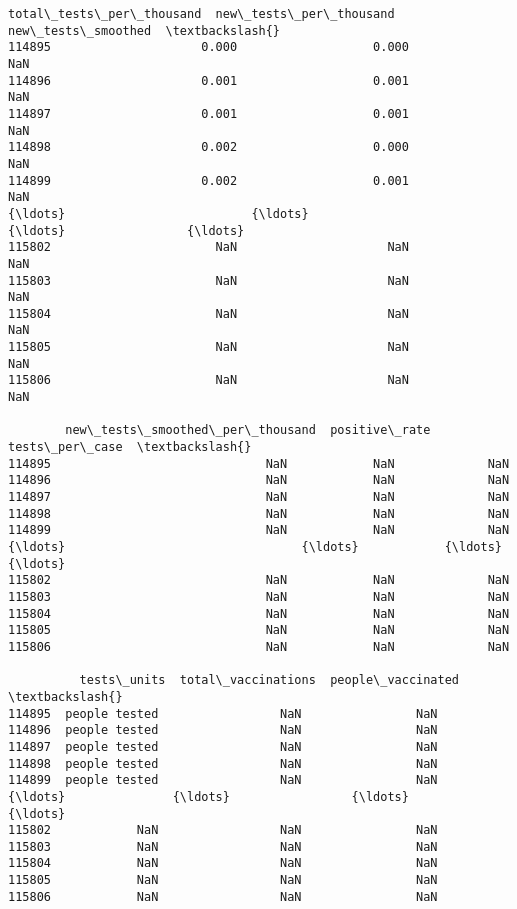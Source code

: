 \documentclass[11pt]{article}
\begin{document}
\begin{tcolorbox}[breakable, size=fbox, boxrule=.5pt, pad at break*=1mm, opacityfill=0]
\begin{Verbatim}[commandchars=\\\{\}]
        total\_tests\_per\_thousand  new\_tests\_per\_thousand  new\_tests\_smoothed  \textbackslash{}
114895                     0.000                   0.000                 NaN
114896                     0.001                   0.001                 NaN
114897                     0.001                   0.001                 NaN
114898                     0.002                   0.000                 NaN
114899                     0.002                   0.001                 NaN
{\ldots}                          {\ldots}                     {\ldots}                 {\ldots}
115802                       NaN                     NaN                 NaN
115803                       NaN                     NaN                 NaN
115804                       NaN                     NaN                 NaN
115805                       NaN                     NaN                 NaN
115806                       NaN                     NaN                 NaN

        new\_tests\_smoothed\_per\_thousand  positive\_rate  tests\_per\_case  \textbackslash{}
114895                              NaN            NaN             NaN
114896                              NaN            NaN             NaN
114897                              NaN            NaN             NaN
114898                              NaN            NaN             NaN
114899                              NaN            NaN             NaN
{\ldots}                                 {\ldots}            {\ldots}             {\ldots}
115802                              NaN            NaN             NaN
115803                              NaN            NaN             NaN
115804                              NaN            NaN             NaN
115805                              NaN            NaN             NaN
115806                              NaN            NaN             NaN

          tests\_units  total\_vaccinations  people\_vaccinated  \textbackslash{}
114895  people tested                 NaN                NaN
114896  people tested                 NaN                NaN
114897  people tested                 NaN                NaN
114898  people tested                 NaN                NaN
114899  people tested                 NaN                NaN
{\ldots}               {\ldots}                 {\ldots}                {\ldots}
115802            NaN                 NaN                NaN
115803            NaN                 NaN                NaN
115804            NaN                 NaN                NaN
115805            NaN                 NaN                NaN
115806            NaN                 NaN                NaN


\end{Verbatim}
\end{tcolorbox}
\end{document}
